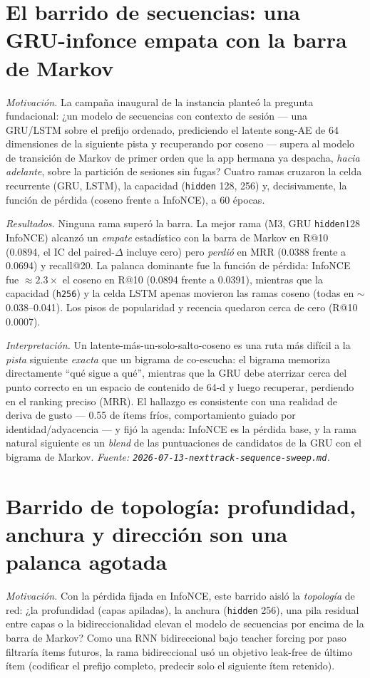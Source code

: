 \documentclass[11pt]{article}
\begin{document}
\section{El barrido de secuencias: una GRU-infonce empata con la barra de Markov}
\label{sec:sweep}
\emph{Motivación.} La campaña inaugural de la instancia planteó la pregunta
fundacional: ¿un modelo de secuencias con contexto de sesión --- una GRU/LSTM
sobre el prefijo ordenado, prediciendo el latente song-AE de 64 dimensiones de
la siguiente pista y recuperando por coseno --- supera al modelo de transición
de Markov de primer orden que la app hermana ya despacha, \emph{hacia adelante},
sobre la partición de sesiones sin fugas? Cuatro ramas cruzaron la celda
recurrente (GRU, LSTM), la capacidad (\texttt{hidden} 128, 256) y,
decisivamente, la función de pérdida (coseno frente a InfoNCE), a 60 épocas.

\emph{Resultados.} Ninguna rama superó la barra. La mejor rama (M3, GRU
\texttt{hidden}128 InfoNCE) alcanzó un \emph{empate} estadístico con la barra de
Markov en R@10 (\num{0.0894}, el IC del paired-$\Delta$ incluye cero) pero
\emph{perdió} en MRR (\num{0.0388} frente a \num{0.0694}) y recall@20. La
palanca dominante fue la función de pérdida: InfoNCE fue $\approx 2.3\times$ el
coseno en R@10 (\num{0.0894} frente a \num{0.0391}), mientras que la capacidad
(\texttt{h256}) y la celda LSTM apenas movieron las ramas coseno (todas en
$\sim$0.038--0.041). Los pisos de popularidad y recencia quedaron cerca de cero
(R@10 \num{0.0007}).

\emph{Interpretación.} Un latente-más-un-solo-salto-coseno es una ruta más
difícil a la \emph{pista} siguiente \emph{exacta} que un bigrama de co-escucha:
el bigrama memoriza directamente ``qué sigue a qué'', mientras que la GRU debe
aterrizar cerca del punto correcto en un espacio de contenido de 64-d y luego
recuperar, perdiendo en el ranking preciso (MRR). El hallazgo es consistente con
una realidad de deriva de gusto --- \num{0.55} de ítems fríos, comportamiento
guiado por identidad/adyacencia --- y fijó la agenda: InfoNCE es la pérdida base,
y la rama natural siguiente es un \emph{blend} de las puntuaciones de candidatos
de la GRU con el bigrama de Markov.
\emph{Fuente: \texttt{2026-07-13-nexttrack-sequence-sweep.md}.}

\section{Barrido de topología: profundidad, anchura y dirección son una palanca agotada}
\label{sec:topology}
\emph{Motivación.} Con la pérdida fijada en InfoNCE, este barrido aisló la
\emph{topología} de red: ¿la profundidad (capas apiladas), la anchura
(\texttt{hidden} 256), una pila residual entre capas o la bidireccionalidad
elevan el modelo de secuencias por encima de la barra de Markov? Como una RNN
bidireccional bajo teacher forcing por paso filtraría ítems futuros, la rama
bidireccional usó un objetivo leak-free de último ítem (codificar el prefijo
completo, predecir solo el siguiente ítem retenido).
\end{document}
